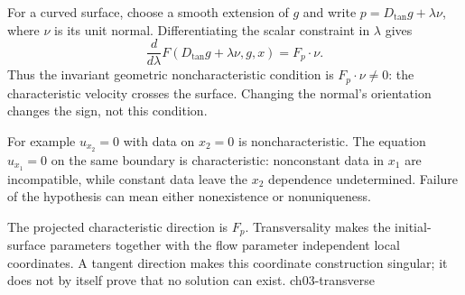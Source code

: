 For a curved surface, choose a smooth extension of $g$ and write
$p=D_{\tan}g+\lambda\nu$, where $\nu$ is its unit normal.
Differentiating the scalar constraint in $\lambda$ gives
\[
 \frac d{d\lambda}F(D_{\tan}g+\lambda\nu,g,x)
       =F_p\cdot\nu.
\]
Thus the invariant geometric noncharacteristic condition is
$F_p\cdot\nu\ne0$: the characteristic velocity crosses the surface.
Changing the normal's orientation changes the sign, not this condition.

For example $u_{x_2}=0$ with data on $x_2=0$ is noncharacteristic.
The equation $u_{x_1}=0$ on the same boundary is characteristic:
nonconstant data in $x_1$ are incompatible, while constant data leave
the $x_2$ dependence undetermined. Failure of the hypothesis can mean
either nonexistence or nonuniqueness.


{The projected characteristic direction is $F_p$. Transversality makes the initial-surface parameters together with the flow parameter independent local coordinates. A tangent direction makes this coordinate construction singular; it does not by itself prove that no solution can exist.}
{ch03-transverse}


